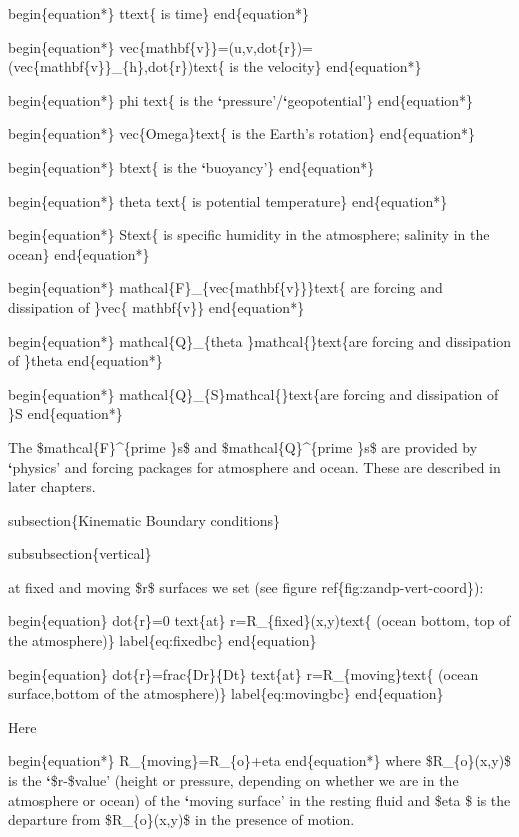 \documentclass[letterpaper,10pt,english]{sphinxmanual}
\begin{document}
begin\{equation*\}
ttext\{ is time\}
end\{equation*\}

begin\{equation*\}
vec\{mathbf\{v\}\}=(u,v,dot\{r\})=(vec\{mathbf\{v\}\}\_\{h\},dot\{r\})text\{ is the
velocity\}
end\{equation*\}

begin\{equation*\}
phi text\{ is the {\color{red}\bfseries{}{}`}pressure'/{\color{red}\bfseries{}{}`}geopotential'\}
end\{equation*\}

begin\{equation*\}
vec\{Omega\}text\{ is the Earth's rotation\}
end\{equation*\}

begin\{equation*\}
btext\{ is the {\color{red}\bfseries{}{}`}buoyancy'\}
end\{equation*\}

begin\{equation*\}
theta text\{ is potential temperature\}
end\{equation*\}

begin\{equation*\}
Stext\{ is specific humidity in the atmosphere; salinity in the ocean\}
end\{equation*\}

begin\{equation*\}
mathcal\{F\}\_\{vec\{mathbf\{v\}\}\}text\{ are forcing and dissipation of \}vec\{
mathbf\{v\}\}
end\{equation*\}

begin\{equation*\}
mathcal\{Q\}\_\{theta \}mathcal\{\}text\{are forcing and dissipation of \}theta
end\{equation*\}

begin\{equation*\}
mathcal\{Q\}\_\{S\}mathcal\{\}text\{are forcing and dissipation of \}S
end\{equation*\}

The \$mathcal\{F\}\textasciicircum{}\{prime \}s\$ and \$mathcal\{Q\}\textasciicircum{}\{prime \}s\$ are provided by
{\color{red}\bfseries{}{}`}physics' and forcing packages for atmosphere and ocean. These are described
in later chapters.

subsection\{Kinematic Boundary conditions\}

subsubsection\{vertical\}

at fixed and moving \$r\$ surfaces we set (see figure ref\{fig:zandp-vert-coord\}):

begin\{equation\}
dot\{r\}=0 text\{at\} r=R\_\{fixed\}(x,y)text\{ (ocean bottom, top of the atmosphere)\}
label\{eq:fixedbc\}
end\{equation\}

begin\{equation\}
dot\{r\}=frac\{Dr\}\{Dt\} text\{at\} r=R\_\{moving\}text\{ (ocean surface,bottom of the atmosphere)\}  label\{eq:movingbc\}
end\{equation\}

Here

begin\{equation*\}
R\_\{moving\}=R\_\{o\}+eta
end\{equation*\}
where \$R\_\{o\}(x,y)\$ is the {\color{red}\bfseries{}{}`}\$r-\$value' (height or pressure, depending on
whether we are in the atmosphere or ocean) of the {\color{red}\bfseries{}{}`}moving surface' in the
resting fluid and \$eta \$ is the departure from \$R\_\{o\}(x,y)\$ in the presence
of motion.
\end{document}

